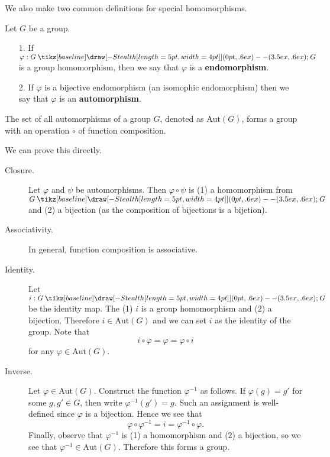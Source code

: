 \documentclass[12pt,letterpaper]{algebra_book}
\renewcommand{\to}{\mathbin{\tikz[baseline] \draw[-{Stealth[length=5pt,width=4pt]}] (0pt,.6ex) -- (3.5ex,.6ex);}}
\renewcommand{\phi}{\varphi}
\theoremstyle{definition}
\begin{document}
    We also make two common definitions for special homomorphisms. 
    \begin{definition}
        Let $G$ be a group.
        \begin{itemize}
            \item[1.] If $\phi: G \to G$ is a group homomorphism, then
            we say that $\phi$ is a \textbf{endomorphism}.
            \item[2.] If $\phi$ is a bijective endomorphism (an
            isomophic endomorphism) then we say that $\phi$ is an \textbf{automorphism}.
        \end{itemize} 
    \end{definition}

    \begin{thm}
        The set of all automorphisms of a group $G$, denoted as
        $\text{Aut}(G)$, forms a group with an operation $\circ$ of
        function composition.
    \end{thm}

    \begin{prf}
        We can prove this directly. 
        \begin{description}
            \item[Closure.] Let $\phi$ and $\psi$ be automorphisms.
            Then $\phi \circ \psi$ is (1) a homomorphism from $G \to
            G$ and (2) a bijection (as the composition of bijections
            is a bijetion).

            \item[Associativity.] In general, function composition is
            associative. 

            \item[Identity.] Let $i:G \to G$ be the identity map. The
            (1) $i$ is a group homomorphism and (2) a bijection.
            Therefore $i \in \text{Aut}(G)$ and we can set $i$ as the
            identity of the group. Note that 
            \[
                i \circ \phi = \phi = \phi \circ i   
            \]
            for any $\phi \in \text{Aut}(G)$. 

            \item[Inverse.] Let $\phi \in \text{Aut}(G)$. Construct
            the function $\phi^{-1}$ as follows. If $\phi(g) = g'$ for
            some $g, g' \in G$, then write $\phi^{-1}(g') = g$. Such
            an assignment is well-defined since  $\phi$ is a
            bijection. Hence we see that 
            \[
                \phi \circ \phi^{-1} = i = \phi^{-1} \circ \phi.
            \]
            Finally, observe that $\phi^{-1}$ is (1) a homomorphism
            and (2) a bijection, so we see that $\phi^{-1} \in
            \text{Aut}(G)$. Therefore this forms a group.
        \end{description}
    \end{prf}
\end{document}
